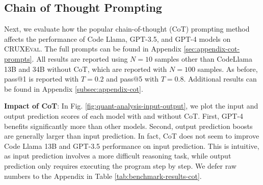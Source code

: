 \documentclass[twoside,11pt,preprint]{article}
\newcommand{\benchmark}{\textsc{CRUXEval}\xspace}
\begin{document}





\subsection{Chain of Thought Prompting} \label{subsec:cot}
Next, we evaluate how the popular chain-of-thought (CoT) prompting method \citep{wei2022chain} affects the performance of Code Llama, GPT-3.5, and GPT-4 models on \benchmark. The full prompts can be found in Appendix \ref{sec:appendix-cot-prompts}. All results are reported using $N=10$ samples other than CodeLlama 13B and 34B without CoT, which are reported with $N=100$ samples. As before, pass@1 is reported with $T=0.2$ and pass@5 with $T=0.8$. Additional results can be found in Appendix \ref{subsec:appendix-cot}.

\textbf{Impact of CoT}: In Fig. \ref{fig:quant-analysis-input-output}, we plot the input and output prediction scores of each model with and without CoT. First, GPT-4 benefits significantly more than other models. Second, output prediction boosts are generally larger than input prediction. In fact, CoT does not seem to improve Code Llama 13B and GPT-3.5 performance on input prediction. This is intuitive, as input prediction involves a more difficult reasoning task, while output prediction only requires executing the program step by step. We defer raw numbers to the Appendix in Table \ref{tab:benchmark-results-cot}.
\end{document}
